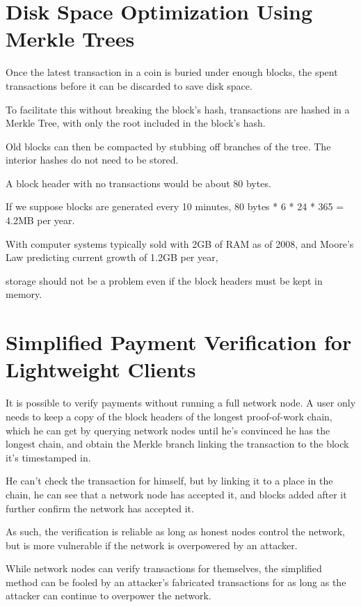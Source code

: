 \documentclass{article}
\begin{document}
\section{Disk Space Optimization Using Merkle Trees}

Once the latest transaction in a coin is buried under enough blocks, the spent transactions before it can be discarded to save disk space.

To facilitate this without breaking the block's hash, transactions are hashed in a Merkle Tree, with only the root included in the block's hash.

Old blocks can then be compacted by stubbing off branches of the tree. The interior hashes do not need to be stored.

A block header with no transactions would be about 80 bytes.

If we suppose blocks are generated every 10 minutes, 80 bytes * 6 * 24 * 365 = 4.2MB per year.

With computer systems typically sold with 2GB of RAM as of 2008, and Moore's Law predicting current growth of 1.2GB per year,

storage should not be a problem even if the block headers must be kept in memory.

\section{Simplified Payment Verification for Lightweight Clients}

It is possible to verify payments without running a full network node. A user only needs to keep a copy of the block headers of the longest proof-of-work chain, which he can get by querying network nodes until he's convinced he has the longest chain, and obtain the Merkle branch linking the transaction to the block it's timestamped in.

He can't check the transaction for himself, but by linking it to a place in the chain, he can see that a network node has accepted it, and blocks added after it further confirm the network has accepted it.

As such, the verification is reliable as long as honest nodes control the network, but is more vulnerable if the network is overpowered by an attacker.

While network nodes can verify transactions for themselves, the simplified method can be fooled by an attacker's fabricated transactions for as long as the attacker can continue to overpower the network.
\end{document}
